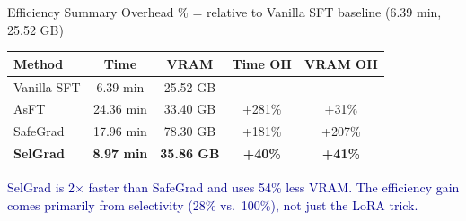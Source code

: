 \documentclass[aspectratio=169, 11pt]{beamer}
\newcommand{\takeaway}[1]{%
\vfill
\begin{center}
\colorbox{darkblue!8}{\parbox{0.92\textwidth}{\centering\small\textcolor{darkblue}{#1}}}
\end{center}
}
\begin{document}
\begin{frame}{Efficiency Summary}
\vspace{6pt}
\centering
{\small Overhead \% = relative to Vanilla SFT baseline (6.39 min, 25.52 GB)}
\vspace{4pt}
\begin{center}
\renewcommand{\arraystretch}{1.5}
\large
\begin{tabular}{lcccc}
\toprule
\textbf{Method} & \textbf{Time} & \textbf{VRAM} & \textbf{Time OH} & \textbf{VRAM OH} \\
\midrule
Vanilla SFT & 6.39 min & 25.52 GB & --- & --- \\
AsFT & 24.36 min & 33.40 GB & +281\% & +31\% \\
SafeGrad & 17.96 min & 78.30 GB & +181\% & +207\% \\
\rowcolor{green!10}
\textbf{SelGrad} & \textbf{8.97 min} & \textbf{35.86 GB} & \textbf{+40\%} & \textbf{+41\%} \\
\bottomrule
\end{tabular}
\end{center}
\takeaway{SelGrad is 2$\times$ faster than SafeGrad and uses 54\% less VRAM. The efficiency gain comes primarily from selectivity (28\% vs.\ 100\%), not just the LoRA trick.}
\end{frame}
\end{document}
